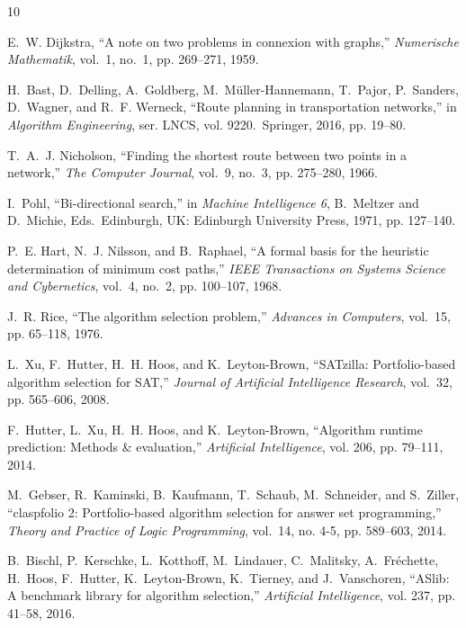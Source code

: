 \documentclass[conference]{IEEEtran}
\renewenvironment{thebibliography}[1]{%
  \begin{oldthebibliography}{#1}%
    \setlength{\itemsep}{0pt}%
    \setlength{\parskip}{0pt}%
}{%
  \end{oldthebibliography}%
}
\begin{document}
\begin{thebibliography}{10}

E.~W. Dijkstra, ``A note on two problems in connexion with graphs,'' \emph{Numerische Mathematik}, vol.~1, no.~1, pp. 269--271, 1959.

H.~Bast, D.~Delling, A.~Goldberg, M.~M{\"u}ller-Hannemann, T.~Pajor, P.~Sanders, D.~Wagner, and R.~F. Werneck, ``Route planning in transportation networks,'' in \emph{Algorithm Engineering}, ser. LNCS, vol. 9220.\ Springer, 2016, pp. 19--80.

T.~A.~J. Nicholson, ``Finding the shortest route between two points in a network,'' \emph{The Computer Journal}, vol.~9, no.~3, pp. 275--280, 1966.

I.~Pohl, ``Bi-directional search,'' in \emph{Machine Intelligence 6}, B.~Meltzer and D.~Michie, Eds.\ Edinburgh, UK: Edinburgh University Press, 1971, pp. 127--140.

P.~E. Hart, N.~J. Nilsson, and B.~Raphael, ``A formal basis for the heuristic determination of minimum cost paths,'' \emph{IEEE Transactions on Systems Science and Cybernetics}, vol.~4, no.~2, pp. 100--107, 1968.

J.~R. Rice, ``The algorithm selection problem,'' \emph{Advances in Computers}, vol.~15, pp. 65--118, 1976.

L.~Xu, F.~Hutter, H.~H. Hoos, and K.~Leyton-Brown, ``{SATzilla}: Portfolio-based algorithm selection for {SAT},'' \emph{Journal of Artificial Intelligence Research}, vol.~32, pp. 565--606, 2008.

F.~Hutter, L.~Xu, H.~H. Hoos, and K.~Leyton-Brown, ``Algorithm runtime prediction: Methods \& evaluation,'' \emph{Artificial Intelligence}, vol. 206, pp. 79--111, 2014.

M.~Gebser, R.~Kaminski, B.~Kaufmann, T.~Schaub, M.~Schneider, and S.~Ziller, ``claspfolio 2: Portfolio-based algorithm selection for answer set programming,'' \emph{Theory and Practice of Logic Programming}, vol.~14, no. 4-5, pp. 589--603, 2014.

B.~Bischl, P.~Kerschke, L.~Kotthoff, M.~Lindauer, C.~Malitsky, A.~Fr{\'e}chette, H.~Hoos, F.~Hutter, K.~Leyton-Brown, K.~Tierney, and J.~Vanschoren, ``{ASlib}: A benchmark library for algorithm selection,'' \emph{Artificial Intelligence}, vol. 237, pp. 41--58, 2016.


\end{thebibliography}
\end{document}
